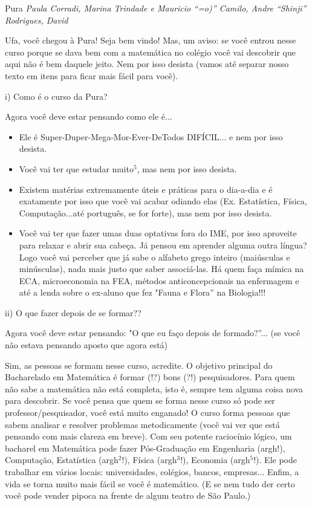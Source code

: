 \begin{subsecao}{Pura}
{\em Paula Corradi, Marina Trindade e Mauricio ``=o)'' Camilo,
Andre “Shinji” Rodrigues, David}

Ufa, você chegou à Pura! Seja bem vindo! Mas, um aviso: se você entrou nesse
curso porque se dava bem com a matemática no colégio você vai descobrir que
aqui não é bem daquele jeito. Nem por isso desista (vamos até separar nosso
texto em itens para ficar mais fácil para você).

i) Como é o curso da Pura?

Agora você deve estar pensando como ele é...
\begin{itemize}

\item Ele é Super-Duper-Mega-Mor-Ever-DeTodos DIFÍCIL... e nem por isso desista.
\item  Você vai ter que estudar muito$^5$, mas nem por isso desista.
\item  Existem matérias extremamente úteis e práticas para o dia-a-dia e é
exatamente por isso que você vai acabar odiando elas (Ex. Estatística, Física,
Computação...até português, se for forte), mas nem por isso desista.
\item  Você vai ter que fazer umas duas optativas fora do IME, por isso
aproveite para relaxar e abrir sua cabeça. Já pensou em aprender alguma outra
língua? Logo você vai perceber que já sabe o alfabeto grego inteiro (maiúsculas
e minúsculas), nada mais justo que saber associá-las. Há quem faça mímica na
ECA, microeconomia na FEA, métodos anticoncepcionais na enfermagem e até a
lenda sobre o ex-aluno que fez "Fauna e Flora” na Biologia!!!

\end{itemize}
ii) O que fazer depois de se formar??

Agora você deve estar pensando: "O que eu faço depois de formado?”... (se você
não estava pensando aposto que agora está)

Sim, as pessoas se formam nesse curso, acredite. O objetivo principal do
Bacharelado em Matemática é formar (!?) bons (?!) pesquisadores. Para quem não
sabe a matemática não está completa, isto é, sempre tem alguma coisa nova para
descobrir. Se você pensa que quem se forma nesse curso só pode ser
professor/pesquisador, você está muito enganado! O curso forma pessoas que
sabem analisar e resolver problemas metodicamente (você vai ver que está
pensando com mais clareza em breve). Com seu potente raciocínio lógico, um
bacharel em Matemática pode fazer Pós-Graduação em Engenharia (argh!),
Computação, Estatística (argh$^2$!), Física (argh$^3$!), Economia (argh$^5$!).
Ele pode trabalhar em vários locais: universidades, colégios, bancos,
empresas... Enfim, a vida se torna muito mais fácil se você é matemático. (E se
nem tudo der certo você pode vender pipoca na frente de algum teatro de São
Paulo.)


\end{subsecao}
